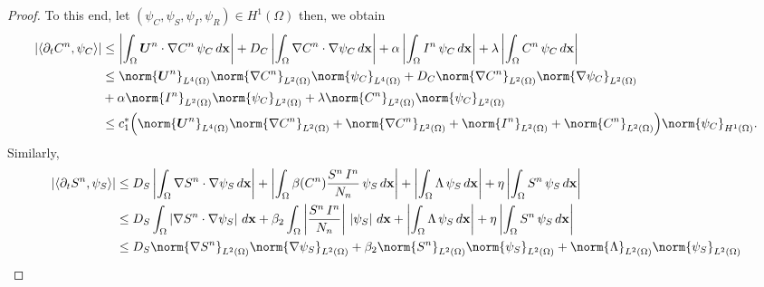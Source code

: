 \documentclass[10pt,number,preprint,times]{elsarticle}
\numberwithin{equation}{section} %
\begin{document}
\begin{proof}
	
\noindent To this end, let $(\psi_C, \psi_S, \psi_I, \psi_R)\in H^1(\Omega)$ then, we obtain
	\begin{eqnarray}\label{eq:1}
	\begin{split}
		\left|\langle\partial_tC^n, \psi_C \rangle\right|&\leq  \left|\int_{\Omega}  \boldsymbol{U}^n\cdot\nabla C^n\, \psi_C\, d\mathbf{x}\right|+ D_C\left|\int_{\Omega}\nabla C^n \cdot\nabla \psi_C\, d\mathbf{x}\right| + 
		 \alpha\left|\int_{\Omega} I^n\, \psi_C\, d\mathbf{x} \right|+ \lambda \left|\int_{\Omega} C^n \,\psi_C \, d\mathbf{x}\right|
		 \\
		&\leq {\norm{\boldsymbol{U}^n}}_{L^4(\Omega)} {\norm{\nabla C^n}}_{L^2(\Omega)} {\norm{\psi_C}}_{L^4(\Omega)}+D_C {\norm{\nabla C^n}}_{L^2(\Omega)} {\norm{\nabla \psi_C}}_{L^2(\Omega)}\\&+\alpha {\norm{I^n}}_{L^2(\Omega)} {\norm{\psi_C}}_{L^2(\Omega)}+ \lambda{\norm{ C^n}}_{L^2(\Omega)} {\norm{\psi_C}}_{L^2(\Omega)}
		 \\
		&\leq c_1^* \Big({\norm{\boldsymbol{U}^n}}_{L^4(\Omega)} {\norm{\nabla C^n}}_{L^2(\Omega)}+ {\norm{\nabla C^n}}_{L^2(\Omega)} %
		+ {\norm{I^n}}_{L^2(\Omega)} + {\norm{ C^n}}_{L^2(\Omega)}\Big) {\norm{\psi_C}}_{H^1(\Omega)}.
		\end{split} 
\end{eqnarray}
Similarly,
	\begin{eqnarray}\label{eq:2}
		\begin{split} 	  		
		\left|\langle\partial_t S^n, \psi_S \rangle\right|&\leq D_S\left|\int_{\Omega}\nabla S^n \cdot\nabla \psi_S\, d\mathbf{x}\right|+\left|\int_{\Omega}\beta(C^n) \frac{S^n\,I^n}{N_n} \, \psi_S\, d\mathbf{x}\right|%
		+\left|\int_{\Omega} \Lambda \,\psi_S \, d\mathbf{x} \right|+ \eta \left|\int_{\Omega} S^n \,\psi_S \, d\mathbf{x}\right|
		\\
		&\leq  D_S\int_{\Omega}\left|\nabla S^n \cdot\nabla \psi_S\right|\, d\mathbf{x}+\beta_2 \int_{\Omega}\left| \frac{S^n\,I^n}{N_n}\right| \, \left|\psi_S\right|\, d\mathbf{x}%
		+\left|\int_{\Omega} \Lambda \,\psi_S \, d\mathbf{x} \right|+ \eta \left|\int_{\Omega} S^n \,\psi_S \, d\mathbf{x}\right|
	 \\
	&\leq D_S {\norm{\nabla S^n}}_{L^2(\Omega)} {\norm{\nabla \psi_S}}_{L^2(\Omega)}+ \beta_2 {\norm{S^n}}_{L^2(\Omega)} {\norm{\psi_S}}_{L^2(\Omega)} +  {\norm{\Lambda}}_{L^2(\Omega)} {\norm{\psi_S}}_{L^2(\Omega)}\\

\end{split}
\end{eqnarray}
\end{proof}
\end{document}

